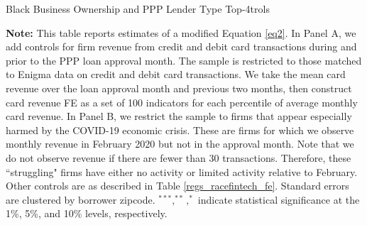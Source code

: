 \documentclass[11pt]{article}
\begin{document}
\newpage
    \begin{table}[H]
    	\caption{Black Business Ownership and PPP Lender Type Top-4trols} \label{regs_racefintech_cardrev}
    	\begin{adjustbox}{width=1.1\linewidth, center}
    		
    	\end{adjustbox}
	    	\begin{adjustbox}{width=\linewidth, center}
    		
    	\end{adjustbox}
    	\begin{minipage}{\linewidth} \medskip
    		\footnotesize{{\bf Note: }This table reports estimates of a modified Equation \ref{eq2}. In Panel A, we add controls for firm revenue from credit and debit card transactions during and prior to the PPP loan approval month. The sample is restricted to those matched to Enigma data on credit and debit card transactions. We take the mean card revenue over the loan approval month and previous two months, then construct card revenue FE as a set of 100 indicators for each percentile of average monthly card revenue. In Panel B, we restrict the sample to firms that appear especially harmed by the COVID-19 economic crisis. These are firms for which we observe monthly revenue in February 2020 but not in the approval month. Note that we do not observe revenue if there are fewer than 30 transactions. Therefore, these ``struggling" firms have either no activity or limited activity relative to February. Other controls are as described in Table \ref{regs_racefintech_fe}. Standard errors are clustered by borrower zipcode. $^{***}, ^{**}, ^{*}$ indicate statistical significance at the 1\%, 5\%, and 10\% levels, respectively.}
    	\end{minipage}
    \end{table}
\end{document}
